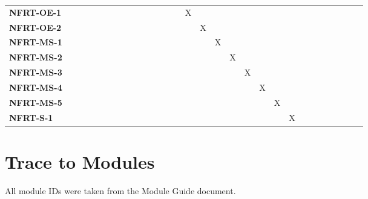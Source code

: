 \documentclass[12pt, titlepage]{article}
\begin{document}
\begin{landscape}
\begin{table}[H]
\begin{adjustbox}{width=\paperwidth}
\begin{tabular}{l|cccccccccccccccccccccc}
        \textbf{NFRT-OE-1}  & ~ & ~ & ~ & ~ & ~ & ~ & ~ & ~ & ~ & X & ~ & ~ & ~ & ~ & ~ & ~ & ~ & ~ & ~ & ~ & ~ & ~\\
        \textbf{NFRT-OE-2}  & ~ & ~ & ~ & ~ & ~ & ~ & ~ & ~ & ~ & ~ & X & ~ & ~ & ~ & ~ & ~ & ~ & ~ & ~ & ~ & ~ & ~\\
        \textbf{NFRT-MS-1}  & ~ & ~ & ~ & ~ & ~ & ~ & ~ & ~ & ~ & ~ & ~ & X & ~ & ~ & ~ & ~ & ~ & ~ & ~ & ~ & ~ & ~\\
        \textbf{NFRT-MS-2}  & ~ & ~ & ~ & ~ & ~ & ~ & ~ & ~ & ~ & ~ & ~ & ~ & X & ~ & ~ & ~ & ~ & ~ & ~ & ~ & ~ & ~\\
        \textbf{NFRT-MS-3}  & ~ & ~ & ~ & ~ & ~ & ~ & ~ & ~ & ~ & ~ & ~ & ~ & ~ & X & ~ & ~ & ~ & ~ & ~ & ~ & ~ & ~\\
        \textbf{NFRT-MS-4}  & ~ & ~ & ~ & ~ & ~ & ~ & ~ & ~ & ~ & ~ & ~ & ~ & ~ & ~ & X & ~ & ~ & ~ & ~ & ~ & ~ & ~\\
        \textbf{NFRT-MS-5}  & ~ & ~ & ~ & ~ & ~ & ~ & ~ & ~ & ~ & ~ & ~ & ~ & ~ & ~ & ~ & X & ~ & ~ & ~ & ~ & ~ & ~\\
        \textbf{NFRT-S-1}   & ~ & ~ & ~ & ~ & ~ & ~ & ~ & ~ & ~ & ~ & ~ & ~ & ~ & ~ & ~ & ~ & X & ~ & ~ & ~ & ~ & ~\\
    \end{tabular}
    \end{adjustbox}
\end{table}
\end{landscape}

\section{Trace to Modules}
All module IDs were taken from the Module Guide document.
\end{document}
